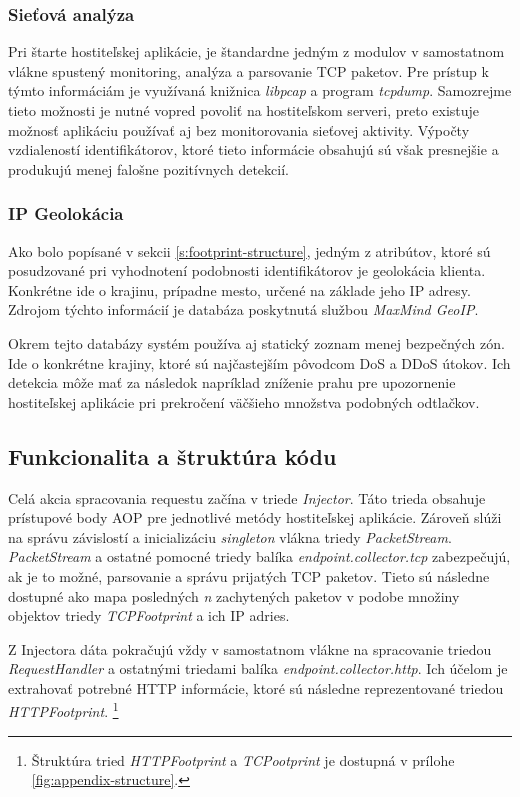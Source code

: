 \documentclass[
  digital, %
  table,   %
  lof,     %
  nolot,   %
  nocover
]{fithesis3}
\begin{document}
\subsubsection{Sieťová analýza}
Pri štarte hostiteľskej aplikácie, je štandardne jedným z modulov v samostatnom
vlákne spustený monitoring, analýza a parsovanie TCP paketov. Pre prístup k
týmto informáciám je využívaná knižnica \textit{libpcap} a program
\textit{tcpdump}. Samozrejme tieto možnosti je nutné vopred povoliť na
hostiteľskom serveri, preto existuje možnosť aplikáciu používať aj bez
monitorovania sieťovej aktivity. Výpočty vzdialeností identifikátorov, ktoré
tieto informácie obsahujú sú však presnejšie a produkujú menej falošne
pozitívnych detekcií.

\subsubsection{IP Geolokácia}
Ako bolo popísané v sekcii \ref{s:footprint-structure}, jedným z atribútov, ktoré sú posudzované pri
vyhodnotení podobnosti identifikátorov je geolokácia klienta. Konkrétne ide o
krajinu, prípadne mesto, určené na základe jeho IP adresy. Zdrojom týchto
informácií je databáza poskytnutá službou \textit{MaxMind GeoIP}.

Okrem tejto databázy systém používa aj statický zoznam menej bezpečných zón.
Ide o konkrétne krajiny, ktoré sú najčastejším pôvodcom DoS a DDoS útokov. Ich
detekcia môže mať za následok napríklad zníženie prahu pre upozornenie
hostiteľskej aplikácie pri prekročení väčšieho množstva podobných odtlačkov.

\subsection{Funkcionalita a štruktúra kódu}
Celá akcia spracovania requestu začína v triede \textit{Injector}. Táto trieda
obsahuje prístupové body AOP pre jednotlivé metódy hostiteľskej aplikácie.
Zároveň slúži na správu závislostí a inicializáciu \textit{singleton} vlákna
triedy \textit{PacketStream}. \textit{PacketStream} a ostatné pomocné triedy
balíka \textit{endpoint.collector.tcp} zabezpečujú, ak je to možné, parsovanie a 
správu prijatých TCP paketov. Tieto sú následne dostupné ako mapa posledných
\textit{n} zachytených paketov v podobe množiny objektov triedy \textit{TCPFootprint} a ich IP
adries.

Z Injectora dáta pokračujú vždy v samostatnom vlákne na spracovanie triedou
\textit{RequestHandler} a ostatnými triedami balíka
\textit{endpoint.collector.http}. Ich účelom je extrahovať potrebné HTTP
informácie, ktoré sú následne reprezentované triedou \textit{HTTPFootprint}.
\footnote{Štruktúra tried \textit{HTTPFootprint} a \textit{TCPootprint} je dostupná v
prílohe \ref{fig:appendix-structure}.}
\end{document}
